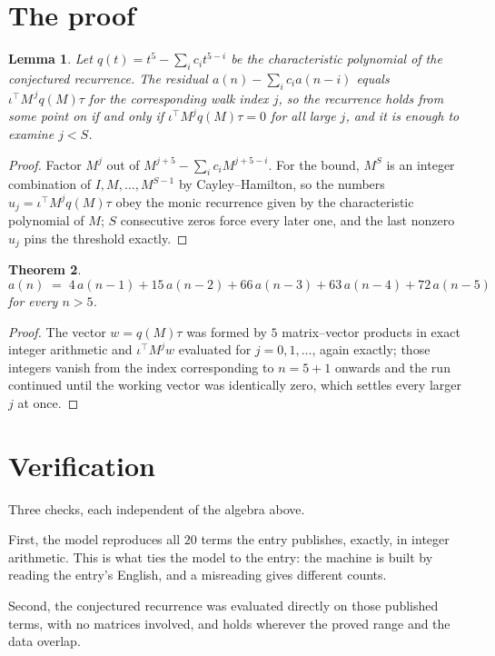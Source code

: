 \documentclass[11pt,a4paper]{article}
\theoremstyle{plain}
\newtheorem{theorem}{Theorem}
\newtheorem{lemma}[theorem]{Lemma}
\theoremstyle{definition}
\begin{document}
\section{The proof}

\begin{lemma}\label{lem:crit}
Let $q(t)=t^{5}-\sum_i c_it^{5-i}$ be the characteristic polynomial of the
conjectured recurrence. The residual $a(n)-\sum_ic_ia(n-i)$ equals
$\iota^{\!\top}M^{\,j}q(M)\tau$ for the corresponding walk index $j$, so the recurrence
holds from some point on if and only if $\iota^{\!\top}M^{j}q(M)\tau=0$ for all large $j$,
and it is enough to examine $j<S$.
\end{lemma}

\begin{proof}
Factor $M^{j}$ out of $M^{j+5}-\sum_ic_iM^{j+5-i}$. For the bound, $M^{S}$
is an integer combination of $I,M,\dots,M^{S-1}$ by Cayley--Hamilton, so the numbers
$u_j=\iota^{\!\top}M^{j}q(M)\tau$ obey the monic recurrence given by the characteristic
polynomial of $M$; $S$ consecutive zeros force every later one, and the last nonzero $u_j$
pins the threshold exactly.
\end{proof}

\begin{theorem}
\[
a(n)\;=\;4\,a(n-1) + 15\,a(n-2) + 66\,a(n-3) + 63\,a(n-4) + 72\,a(n-5)
\]
for every $n>5$.
\end{theorem}

\begin{proof}
The vector $w=q(M)\tau$ was formed by $5$ matrix--vector products in exact integer
arithmetic and $\iota^{\!\top}M^{j}w$ evaluated for $j=0,1,\dots$, again exactly; those
integers vanish from the index corresponding to $n=5+1$ onwards and the run continued
until the working vector was identically zero, which settles every larger $j$ at once.
\end{proof}

\section{Verification}

Three checks, each independent of the algebra above.

First, the model reproduces all $20$ terms the entry publishes, exactly, in integer
arithmetic. This is what ties the model to the entry: the machine is built by reading the
entry's English, and a misreading gives different counts.

Second, the conjectured recurrence was evaluated directly on those published terms, with no
matrices involved, and holds wherever the proved range and the data overlap.
\end{document}
